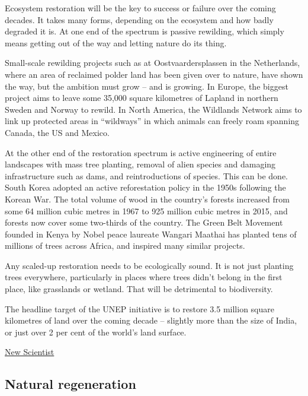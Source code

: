 \documentclass[
]{book}
\begin{document}
Ecosystem restoration will be the key to success or failure over the coming decades. It takes many forms, depending on the ecosystem and how badly degraded it is. At one end of the spectrum is passive rewilding, which simply means getting out of the way and letting nature do its thing.

Small-scale rewilding projects such as at Oostvaardersplassen in the Netherlands, where an area of reclaimed polder land has been given over to nature, have shown the way, but the ambition must grow -- and is growing. In Europe, the biggest project aims to leave some 35,000 square kilometres of Lapland in northern Sweden and Norway to rewild. In North America, the Wildlands Network aims to link up protected areas in ``wildways'' in which animals can freely roam spanning Canada, the US and Mexico.

At the other end of the restoration spectrum is active engineering of entire landscapes with mass tree planting, removal of alien species and damaging infrastructure such as dams, and reintroductions of species. This can be done. South Korea adopted an active reforestation policy in the 1950s following the Korean War. The total volume of wood in the country's forests increased from some 64 million cubic metres in 1967 to 925 million cubic metres in 2015, and forests now cover some two-thirds of the country. The Green Belt Movement founded in Kenya by Nobel peace laureate Wangari Maathai has planted tens of millions of trees across Africa, and inspired many similar projects.

Any scaled-up restoration needs to be ecologically sound.
It is not just planting trees everywhere, particularly in places where trees
didn't belong in the first place, like grasslands or wetland.
That will be detrimental to biodiversity.

The headline target of the UNEP initiative is to restore 3.5 million square kilometres of land over the coming decade -- slightly more than the size of India, or just over 2 per cent of the world's land surface.

\href{https://www.newscientist.com/article/mg24933223-300-rescue-plan-for-nature-how-to-fix-the-biodiversity-crisis/}{New Scientist}

\hypertarget{natural-regeneration}{%
\subsection{Natural regeneration}\label{natural-regeneration}}
\end{document}
